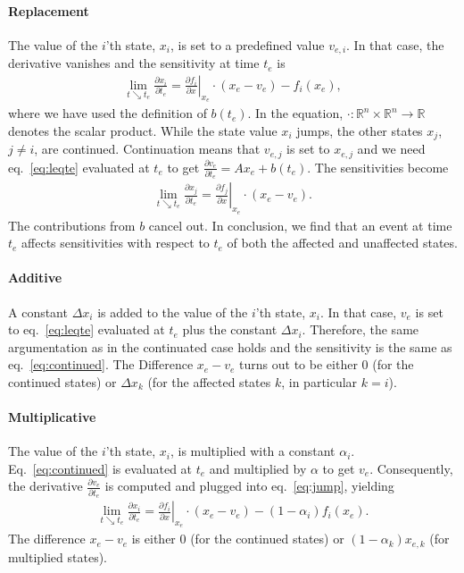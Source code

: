\documentclass[journal, a4paper]{IEEEtran}
\begin{document}
\paragraph{Replacement} 
The value of the $i$'th state, $x_i$, is set to a predefined value $v_{e, i}$. In that case, the derivative vanishes and the sensitivity at time $t_e$ is
\begin{align}
    \lim_{t\searrow t_e}\frac{\partial x_i}{\partial t_e} = \left.\frac{\partial f_i}{\partial x}\right|_{x_e}\cdot (x_e - v_e) - f_i(x_e),
    \label{eq:replace}
\end{align}
where we have used the definition of $b(t_e)$. In the equation, $\cdot: \mathbb R^n\times \mathbb R^n\rightarrow \mathbb R$ denotes the scalar product. While the state value $x_i$ jumps, the other states $x_j$, $j\neq i$, are continued. Continuation means that $v_{e, j}$ is set to $x_{e, j}$ and we need eq.~\eqref{eq:leqte} evaluated at $t_e$ to get $\frac{\partial v_e}{\partial t_e} = Ax_e + b(t_e)$. The sensitivities become 
\begin{align}
    \lim_{t\searrow t_e}\frac{\partial x_j}{\partial t_e} = \left.\frac{\partial f_j}{\partial x}\right|_{x_e}\cdot (x_e - v_e).\label{eq:continued}
\end{align}
The contributions from $b$ cancel out. In conclusion, we find that an event at time $t_e$ affects sensitivities with respect to $t_e$ of both the affected and unaffected states.\\

\paragraph{Additive} 
A constant $\Delta x_i$ is added to the value of the $i$'th state, $x_i$. In that case, $v_e$ is set to eq.~\eqref{eq:leqte} evaluated at $t_e$ plus the constant $\Delta x_i$. Therefore, the same argumentation as in the continuated case holds and the sensitivity is the same as eq.~\eqref{eq:continued}. The Difference $x_e - v_e$ turns out to be either 0 (for the continued states) or $\Delta x_k$ (for the affected states $k$, in particular $k = i$).\\

\paragraph{Multiplicative}
The value of the $i$'th state, $x_i$, is multiplied with a constant $\alpha_i$. Eq.~\eqref{eq:continued} is evaluated at $t_e$ and multiplied by $\alpha$ to get $v_e$. Consequently, the derivative $\frac{\partial v_e}{\partial t_e}$ is computed and plugged into eq.~\eqref{eq:jump}, yielding
\begin{align}
    \lim_{t\searrow t_e}\frac{\partial x_i}{\partial t_e} = \left.\frac{\partial f_i}{\partial x}\right|_{x_e}\cdot (x_e - v_e) - (1-\alpha_i)f_i(x_e).
\end{align}
The difference $x_e - v_e$ is either 0 (for the continued states) or $(1-\alpha_k)x_{e, k}$ (for multiplied states).
\end{document}
